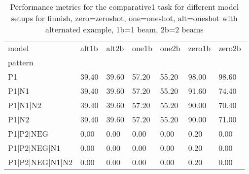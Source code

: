 \begin{table}[h]
\begin{tabular}{l|llllll}
\toprule
model & alt1b & alt2b & one1b & one2b & zero1b & zero2b \\
pattern &  &  &  &  &  &  \\
\midrule
P1 & 39.40 & 39.60 & 57.20 & 55.20 & 98.00 & 98.60 \\
P1|N1 & 39.40 & 39.60 & 57.20 & 55.20 & 91.60 & 74.40 \\
P1|N1|N2 & 39.40 & 39.60 & 57.20 & 55.20 & 90.00 & 70.40 \\
P1|N2 & 39.40 & 39.60 & 57.20 & 55.20 & 90.00 & 71.00 \\
P1|P2|NEG & 0.00 & 0.00 & 0.00 & 0.00 & 0.20 & 0.00 \\
P1|P2|NEG|N1 & 0.00 & 0.00 & 0.00 & 0.00 & 0.20 & 0.00 \\
P1|P2|NEG|N1|N2 & 0.00 & 0.00 & 0.00 & 0.00 & 0.20 & 0.00 \\
\bottomrule
\end{tabular}
\caption{Performance metrics for the comparative1 task for different model setups for finnish, zero=zeroshot, one=oneshot, alt=oneshot with alternated example, 1b=1 beam, 2b=2 beams}
\label{tab:fi_comparative1_performance}
\end{table}
